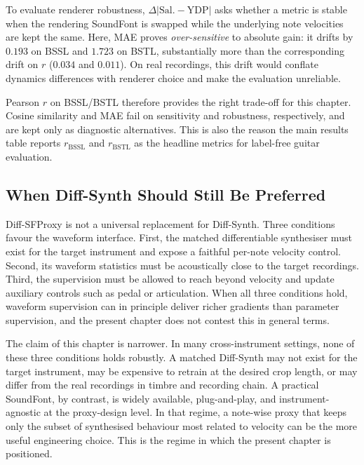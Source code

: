 To evaluate renderer robustness, $\Delta\lvert\mathrm{Sal.} - \mathrm{YDP}\rvert$ asks whether a metric is stable when the rendering SoundFont is swapped while the underlying note velocities are kept the same. Here, MAE proves \emph{over-sensitive} to absolute gain: it drifts by $0.193$ on BSSL and $1.723$ on BSTL, substantially more than the corresponding drift on $r$ ($0.034$ and $0.011$). On real recordings, this drift would conflate dynamics differences with renderer choice and make the evaluation unreliable.

Pearson $r$ on BSSL/BSTL therefore provides the right trade-off for this chapter. Cosine similarity and MAE fail on sensitivity and robustness, respectively, and are kept only as diagnostic alternatives. This is also the reason the main results table reports $r_{\mathrm{BSSL}}$ and $r_{\mathrm{BSTL}}$ as the headline metrics for label-free guitar evaluation.

\subsection{When Diff-Synth Should Still Be Preferred}
\label{ssec:bp:when_diffsynth}

Diff-SFProxy is not a universal replacement for Diff-Synth. Three conditions favour the waveform interface. First, the matched differentiable synthesiser must exist for the target instrument and expose a faithful per-note velocity control. Second, its waveform statistics must be acoustically close to the target recordings. Third, the supervision must be allowed to reach beyond velocity and update auxiliary controls such as pedal or articulation. When all three conditions hold, waveform supervision can in principle deliver richer gradients than parameter supervision, and the present chapter does not contest this in general terms.

The claim of this chapter is narrower. In many cross-instrument settings, none of these three conditions holds robustly. A matched Diff-Synth may not exist for the target instrument, may be expensive to retrain at the desired crop length, or may differ from the real recordings in timbre and recording chain. A practical SoundFont, by contrast, is widely available, plug-and-play, and instrument-agnostic at the proxy-design level. In that regime, a note-wise proxy that keeps only the subset of synthesised behaviour most related to velocity can be the more useful engineering choice. This is the regime in which the present chapter is positioned.

